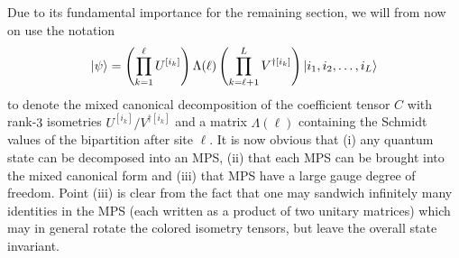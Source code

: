 \documentclass{svmono}
\newcommand{\brlr}[1]{\left( #1 \right)}
\begin{document}
Due to its fundamental importance for the remaining section, we will from now on use the notation
\begin{align}
    \ket\psi = \brlr{\prod_{k=1}^\ell U^{[i_k]}}\Lambda(\ell)\brlr{\prod_{k=\ell+1}^L V^{\dag[i_k]}}\ket{i_1,i_2,\dots,i_L}
\end{align}
to denote the mixed canonical decomposition of the coefficient tensor $C$ with rank-$3$ isometries ${U^{[i_k]}/V^{\dag[i_k]}}$ and a matrix $\Lambda(\ell)$ containing the Schmidt values of the bipartition after site $\ell$.
It is now obvious that (i) any quantum state can be decomposed into an MPS, (ii) that each MPS can be brought into the mixed canonical form and (iii) that MPS have a large gauge degree of freedom.
Point (iii) is clear from the fact that one may sandwich infinitely many identities in the MPS (each written as a product of two unitary matrices) which may in general rotate the colored isometry tensors, but leave the overall state invariant.
\end{document}
